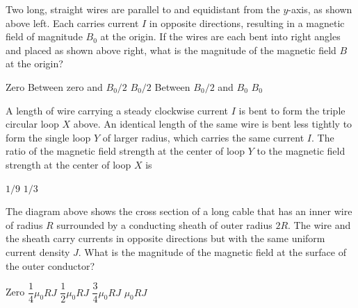 \documentclass[12pt]{../oss-classkick-exam}
\begin{document}
\begin{questions}
  \question Two long, straight wires are parallel to and equidistant from the
  $y$-axis, as shown above left. Each carries current $I$ in opposite
  directions, resulting in a magnetic field of magnitude $B_0$ at the origin.
  If the wires are each bent into right angles and placed as shown above right,
  what is the magnitude of the magnetic field $B$ at the origin?
  \begin{choices}
    \choice Zero
    \choice Between zero and $B_0/2$
    \choice $B_0/2$
    \choice Between $B_0/2$ and $B_0$
    \choice $B_0$
    \end{choices}


  \question A length of wire carrying a steady clockwise current $I$ is bent
  to form the triple circular loop $X$ above. An identical length of the same
  wire is bent less tightly to form the single loop $Y$ of larger radius, which
  carries the same current $I$. The ratio of the magnetic field strength at the
  center of loop $Y$ to the magnetic field strength at the center of loop $X$ is
  \begin{choices}
    \choice $1/9$
    \choice $1/3$
  \end{choices}
  
  \question The diagram above shows the cross section of a long cable that has
  an inner wire of radius $R$ surrounded by a conducting sheath of outer radius
  $2R$. The wire and the sheath carry currents in opposite directions but with
  the same uniform current density $J$. What is the magnitude of the magnetic
  field at the surface of the outer conductor?
  \begin{choices}
    \choice Zero
    \choice $\dfrac14\mu_0RJ$
    \choice $\dfrac12\mu_0RJ$
    \choice $\dfrac34\mu_0RJ$
    \choice $\mu_0RJ$
  \end{choices}


\end{questions}
\end{document}
